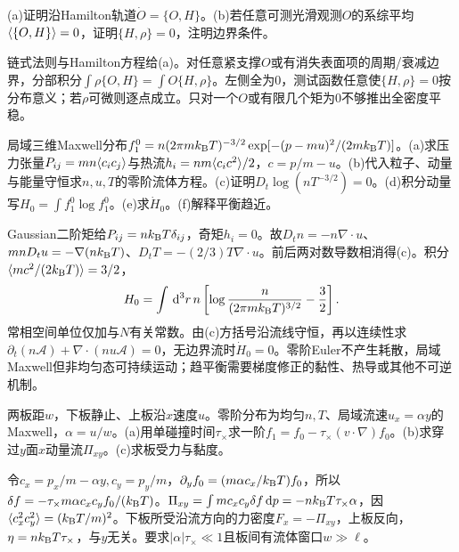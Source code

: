 \begin{exercise}[原题1(a)--(b)]\label{p:333-3-1}
(a)证明沿Hamilton轨道$\dot O=\{O,H\}$。(b)若任意可测光滑观测$O$的系综平均$\langle \{O,H\}\rangle=0$，证明$\{H,\rho\}=0$，注明边界条件。
\end{exercise}
\begin{solution}
链式法则与Hamilton方程给(a)。对任意紧支撑$O$或有消失表面项的周期/衰减边界，分部积分$\int\rho\{O,H\}=\int O\{H,\rho\}$。左侧全为0，测试函数任意使$\{H,\rho\}=0$按分布意义；若$\rho$可微则逐点成立。只对一个$O$或有限几个矩为0不够推出全密度平稳。
\end{solution}
\begin{exercise}[原题2(a)--(f)]\label{p:333-3-2}
局域三维Maxwell分布$f_1^0=n(2\pi mk_{\mathrm B} T)^{-3/2}\exp[-(p-mu)^2/(2mk_{\mathrm B} T)]$。(a)求压力张量$P_{ij}=mn\langle c_ic_j\rangle$与热流$h_i=nm\langle c_ic^2\rangle/2$，$c=p/m-u$。(b)代入粒子、动量与能量守恒求$n,u,T$的零阶流体方程。(c)证明$D_t\log(nT^{-3/2})=0$。(d)积分动量写$H_0=\int f_1^0\log f_1^0$。(e)求$\dot H_0$。(f)解释平衡趋近。
\end{exercise}
\begin{solution}
Gaussian二阶矩给$P_{ij}=nk_{\mathrm B} T\delta_{ij}$，奇矩$h_i=0$。故$D_tn=-n\nabla\cdot u$、$mnD_tu=-\nabla(nk_{\mathrm B} T)$、$D_tT=-(2/3)T\nabla\cdot u$。前后两对数导数相消得(c)。积分$\langle mc^2/(2k_{\mathrm B} T)\rangle=3/2$，
\begin{equation}
H_0=\int\,\mathrm d^3r\,n\left[\log\frac n{(2\pi mk_{\mathrm B} T)^{3/2}}-\frac32\right].
\end{equation}
常相空间单位仅加与$N$有关常数。由(c)方括号沿流线守恒，再以连续性求$\partial_t(n\mathcal A)+\nabla\cdot(nu\mathcal A)=0$，无边界流时$\dot H_0=0$。零阶Euler不产生耗散，局域Maxwell但非均匀态可持续运动；趋平衡需要梯度修正的黏性、热导或其他不可逆机制。
\end{solution}
\begin{exercise}[原题3(a)--(c)]\label{p:333-3-3}
两板距$w$，下板静止、上板沿$x$速度$u$。零阶分布为均匀$n,T$、局域流速$u_x=\alpha y$的Maxwell，$\alpha=u/w$。(a)用单碰撞时间$\tau_\times$求一阶$f_1=f_0-\tau_\times(v\cdot\nabla)f_0$。(b)求穿过$y$面$x$动量流$\Pi_{xy}$。(c)求板受力与黏度。
\end{exercise}
\begin{solution}
令$c_x=p_x/m-\alpha y,c_y=p_y/m$，$\partial_yf_0=(m\alpha c_x/k_{\mathrm B} T)f_0$，所以$\delta f=-\tau_\times m\alpha c_xc_yf_0/(k_{\mathrm B} T)$。$\Pi_{xy}=\int mc_xc_y\delta f\,\mathrm d p=-nk_{\mathrm B} T\tau_\times\alpha$，因$\langle c_x^2c_y^2\rangle=(k_{\mathrm B} T/m)^2$。下板所受沿流方向的力密度$F_x=-\Pi_{xy}$，上板反向，$\eta=nk_{\mathrm B} T\tau_\times$，与$y$无关。要求$|\alpha|\tau_\times\ll1$且板间有流体窗口$w\gg\ell$。
\end{solution}
